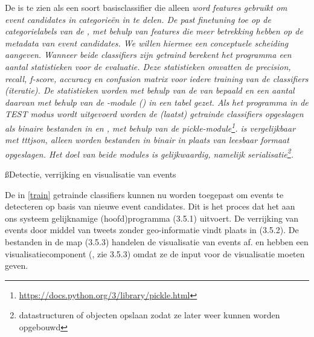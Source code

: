{{De  is te zien als een soort basisclassifier die alleen \it{word 
features} gebruikt om event candidates in categorie\"en in te delen. De 
 past \it{finetuning} toe op de categorielabels van de 
, met behulp van features die meer betrekking hebben op de 
\it{metadata} van event candidates. We willen hiermee een conceptuele scheiding aangeven.
\vl
Wanneer beide classifiers zijn getraind berekent het programma een aantal 
statistieken voor de evaluatie. Deze statistieken omvatten de \it{precision}, \it{recall}, 
\it{f-score}, \it{accuracy} en \it{confusion matrix} voor iedere training van de classifiers 
(iteratie). De statistieken worden met behulp van de  van  bepaald en 
een aantal daarvan met behulp van de -module () 
in een tabel gezet.
\vl
Als het programma in de TEST modus wordt uitgevoerd worden de (laatst) getrainde 
classifiers opgeslagen als binaire bestanden in 
 en , 
met behulp van de pickle-module\footnote{\url{https://docs.python.org/3/library/pickle.html}}.
 is vergelijkbaar met ttt{json}, alleen worden bestanden in binair in plaats van
leesbaar formaat opgeslagen. Het doel van beide modules is gelijkwaardig, namelijk
\it{serialisatie}\footnote{datastructuren of objecten opslaan zodat ze later weer kunnen 
worden opgebouwd}.

\ss{Detectie, verrijking en visualisatie van events}

De in \ref{train} getrainde classifiers kunnen nu worden toegepast om events te 
detecteren op basis van nieuwe event candidates. Dit is het proces dat het aan 
ons systeem gelijknamige (hoofd)programma  (3.5.1) uitvoert. De 
verrijking van events door middel van tweets zonder geo-informatie vindt plaats 
in  (3.5.2). De bestanden in de map  (3.5.3) handelen 
de visualisatie van events af.  en  hebben een 
visualisatiecomponent (, zie 3.5.3) omdat ze de input voor de 
visualisatie moeten geven.

\label{EventDetective}

}}
